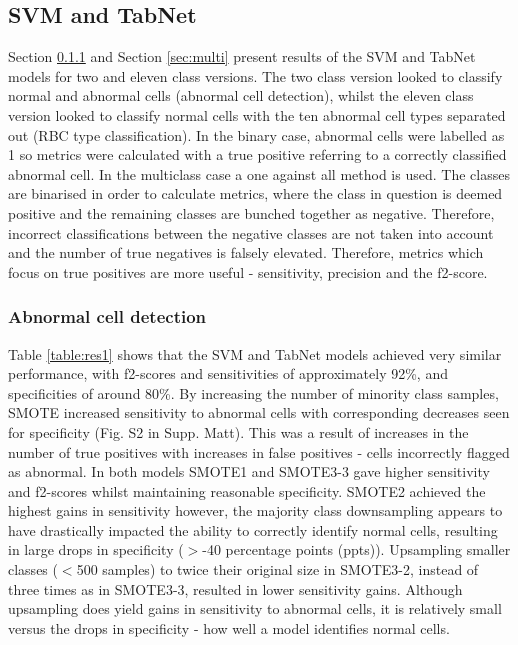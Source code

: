 \documentclass[final,5p,times,twocolumn,authoryear]{elsarticle}
\begin{document}
\subsection{SVM and TabNet}

Section \ref{sec:binary} and Section \ref{sec:multi} present results of the SVM and TabNet models for two and eleven class versions. The two class version looked to classify normal and abnormal cells (abnormal cell detection), whilst the eleven class version looked to classify normal cells with the ten abnormal cell types separated out (RBC type classification).  In the binary case, abnormal cells were labelled as 1 so metrics were calculated with a true positive referring to a correctly classified abnormal cell. In the multiclass case a one against all method is used. The classes are binarised in order to calculate metrics, where the class in question is deemed positive and the remaining classes are bunched together as negative. Therefore, incorrect classifications between the negative classes are not taken into account and the number of true negatives is falsely elevated. Therefore, metrics which focus on true positives are more useful - sensitivity, precision and the f2-score. 


\subsubsection{Abnormal cell detection}
\label{sec:binary}

Table \ref{table:res1} shows that the SVM and TabNet models achieved very similar performance, with f2-scores and sensitivities of approximately 92\%, and specificities of around 80\%. By increasing the number of minority class samples, SMOTE increased sensitivity to abnormal cells with corresponding decreases seen for specificity (Fig. S2 in Supp. Matt). This was a result of increases in the number of true positives with increases in false positives - cells incorrectly flagged as abnormal.
In both models SMOTE1 and SMOTE3-3 gave higher sensitivity and f2-scores whilst maintaining reasonable specificity. SMOTE2 achieved the highest gains in sensitivity however, the majority class downsampling appears to have drastically impacted the ability to correctly identify normal cells, resulting in large drops in specificity ($>$-40 percentage points (ppts)). Upsampling smaller classes ($<$500 samples) to twice their original size in SMOTE3-2, instead of three times as in SMOTE3-3, resulted in lower sensitivity gains.
Although upsampling does yield gains in sensitivity to abnormal cells, it is relatively small versus the drops in specificity - how well a model identifies normal cells.
\end{document}
